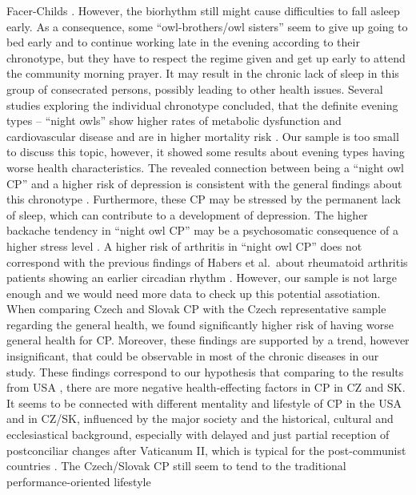 \documentclass[ijerph,article,accept,moreauthors,pdftex]{mdpi}
\begin{document}
Facer-Childs \citep{facer2019resetting}. However, the biorhythm still
might cause difficulties to fall asleep early. As a consequence, some
``owl-brothers/owl sisters'' seem to give up going to bed early and to
continue working late in the evening according to their chronotype, but
they have to respect the regime given and get up early to attend the
community morning prayer. It may result in the chronic lack of sleep in
this group of consecrated persons, possibly leading to other health
issues. Several studies exploring the individual chronotype concluded,
that the definite evening types -- ``night owls'' show higher rates of
metabolic dysfunction and cardiovascular disease and are in higher
mortality risk \citep{knutson2018associations}. Our sample is too small
to discuss this topic, however, it showed some results about evening
types having worse health characteristics. The revealed connection
between being a ``night owl CP'' and a higher risk of depression is
consistent with the general findings about this chronotype
\citep{facer2019resetting}. Furthermore, these CP may be stressed by the
permanent lack of sleep, which can contribute to a development of
depression. The higher backache tendency in ``night owl CP'' may be a
psychosomatic consequence of a higher stress level
\citep{hajnovic2018causal}. A higher risk of arthritis in ``night owl
CP'' does not correspond with the previous findings of Habers et
al.~about rheumatoid arthritis patients showing an earlier circadian
rhythm \citep{habers2021earlier}. However, our sample is not large
enough and we would need more data to check up this potential
assotiation. When comparing Czech and Slovak CP with the Czech
representative sample regarding the general health, we found
significantly higher risk of having worse general health for CP.
Moreover, these findings are supported by a trend, however
insignificant, that could be observable in most of the chronic diseases
in our study. These findings correspond to our hypothesis that comparing
to the results from USA
\citep{schott2019stability, weinstein2019autonomous}, there are more
negative health-effecting factors in CP in CZ and SK. It seems to be
connected with different mentality and lifestyle of CP in the USA and in
CZ/SK, influenced by the major society and the historical, cultural and
ecclesiastical background, especially with delayed and just partial
reception of postconciliar changes after Vaticanum II, which is typical
for the post-communist countries
\citep{fiala2000koncil, balik2012letnice}. The Czech/Slovak CP still
seem to tend to the traditional performance-oriented lifestyle
\end{document}

